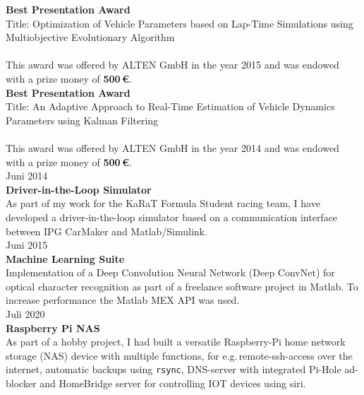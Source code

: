 \documentclass{mycv}
\begin{document}
{\rlap{\color{templateColor1}\rule[0mm]{\textwidth}{\ulinewidth}}}
\begin{paracol}{2}
	  {\RaggedLeft \bfseries Best Presentation Award\\}
	  {Title}: Optimization of Vehicle Parameters based on Lap-Time
	  Simulations using Multiobjective Evolutionary Algorithm\\\\
	  {\footnotesize This award was offered by ALTEN GmbH in the year 2015 and
			was endowed with a prize money of {\bfseries500\,\euro{}}.}\\

	  {\RaggedLeft \bfseries Best Presentation Award\\}
	  {Title}: An Adaptive Approach to Real-Time Estimation of
	  Vehicle Dynamics Parameters using Kalman Filtering\\\\
	  {\footnotesize This award was offered by ALTEN GmbH in the year 2014 and
			was endowed with a prize money of {\bfseries500\,\euro{}}.}\\


	{\RaggedLeft Juni 2014\\ \bfseries Driver-in-the-Loop Simulator\\}
	As part of my work for the KaRaT Formula Student racing team, I
	have developed a driver-in-the-loop simulator based on a communication
	interface between {IPG CarMaker} and {Matlab/Simulink}.\\

	{\RaggedLeft Juni 2015\\ \bfseries Machine Learning Suite\\}
	Implementation of a Deep Convolution Neural Network (Deep ConvNet) for
	optical character recognition as part of a freelance software project in
	Matlab. To
	increase performance the {Matlab MEX API} was used.\\

	{\RaggedLeft Juli 2020\\ \bfseries Raspberry Pi NAS\\}
	As part of a hobby project, I had built a versatile Raspberry-Pi home network
	storage (NAS) device with multiple functions, for e.g.\,remote-ssh-access
	over the internet, automatic backups using \verb|rsync|, DNS-server with
	integrated Pi-Hole ad-blocker and HomeBridge server for controlling IOT
	devices using siri.


\end{paracol}
\end{document}
